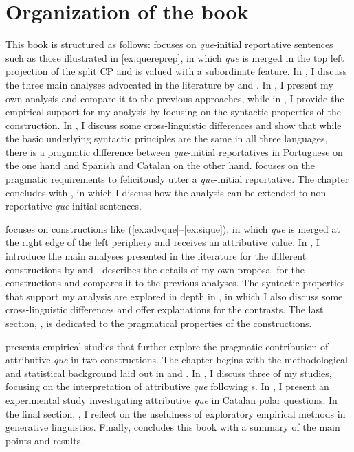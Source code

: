 \section{Organization of the book}

This book is structured as follows:  focuses on \emph{que}-initial reportative sentences such as those illustrated in \eqref{ex:quereprep}, in which \emph{que} is merged in the top left projection of the split CP and is valued with a subordinate feature. In , I  discuss the three main analyses advocated in the literature by  \citet{Etxepare2007,Etxepare2010,Etxepare2013,DemonteSoriano2014} and \citet{Corr2016}.  In  , I present  my own analysis and compare it to the previous approaches, while in , I provide the empirical support for my analysis by focusing on the syntactic properties of the construction. In , I discuss some cross-linguistic differences and show that while  the basic underlying syntactic principles are the same in all three languages, there is a pragmatic difference between \emph{que}-initial reportatives in Portuguese on the one hand and Spanish and Catalan  on the other hand.  focuses on the pragmatic requirements to felicitously utter a \emph{que}-initial reportative. The chapter concludes with ,  in which I discuss how the analysis can be extended to non-reportative \emph{que}-initial sentences. 

 focuses on  constructions like (\ref{ex:advque}--\ref{ex:sique}), in which \emph{que} is merged at the right edge of the left periphery and  receives an attributive value. In , I introduce the  main analyses presented in the literature for the different constructions by \citet{Ambar2003,Castroviejo2006,Hernanz2007,PrietoRigau2007,DemonteSoriano2009,Corr2016} and \citet{Cruschina2018}.   describes the details of my own proposal for the constructions and compares it to the previous analyses. The syntactic properties that support my analysis are explored in depth  in , in which I also discuss some cross-lin\-guis\-tic differences and offer explanations for the contrasts. The last section, , is dedicated to the pragmatical properties of the constructions.

 presents  empirical studies that further explore the pragmatic contribution of attributive \emph{que} in two constructions. The chapter begins with the methodological and statistical background laid out in    and . In , I discuss three of my studies, focusing  on the interpretation of attributive \emph{que} following s. In , I present an experimental study investigating attributive \emph{que} in Catalan polar questions. In the final section, , I reflect on the usefulness of exploratory empirical methods in generative linguistics. Finally,  concludes this book with a summary of the  main points and results.
